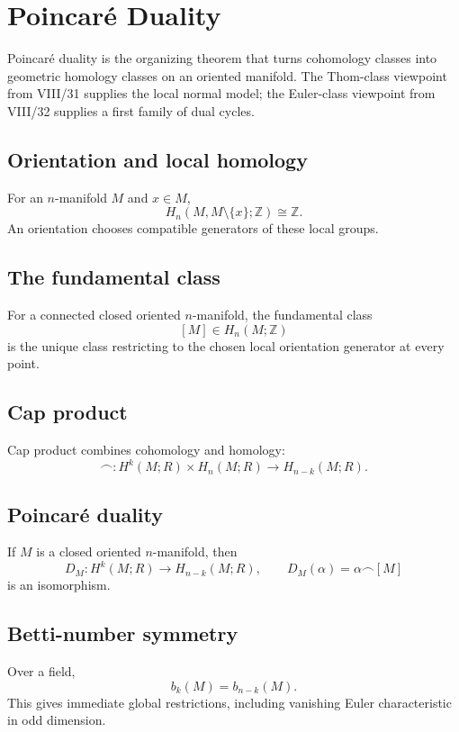 
\chapter{Poincaré Duality}
\label{ch:viii33-poincare-duality}

Poincaré duality is the organizing theorem that turns cohomology classes into
geometric homology classes on an oriented manifold.  The Thom-class viewpoint
from VIII/31 supplies the local normal model; the Euler-class viewpoint from
VIII/32 supplies a first family of dual cycles.

\section{Orientation and local homology}
For an $n$-manifold $M$ and $x\in M$,
\[
H_n(M,M\setminus\{x\};\mathbb Z)\cong\mathbb Z.
\]
An orientation chooses compatible generators of these local groups.

\section{The fundamental class}
\begin{definition}
\label{def:viii33-fundamental-class}
For a connected closed oriented $n$-manifold, the fundamental class
\[
[M]\in H_n(M;\mathbb Z)
\]
is the unique class restricting to the chosen local orientation generator at
every point.
\end{definition}

\section{Cap product}
Cap product combines cohomology and homology:
\[
\frown:H^k(M;R)\times H_n(M;R)\longrightarrow H_{n-k}(M;R).
\]

\section{Poincaré duality}
\begin{theorem}
\label{thm:viii33-poincare-duality}
If $M$ is a closed oriented $n$-manifold, then
\[
D_M:H^k(M;R)\longrightarrow H_{n-k}(M;R),
\qquad
D_M(\alpha)=\alpha\frown[M]
\]
is an isomorphism.
\end{theorem}

\section{Betti-number symmetry}
Over a field,
\[
b_k(M)=b_{n-k}(M).
\]
This gives immediate global restrictions, including vanishing Euler
characteristic in odd dimension.

